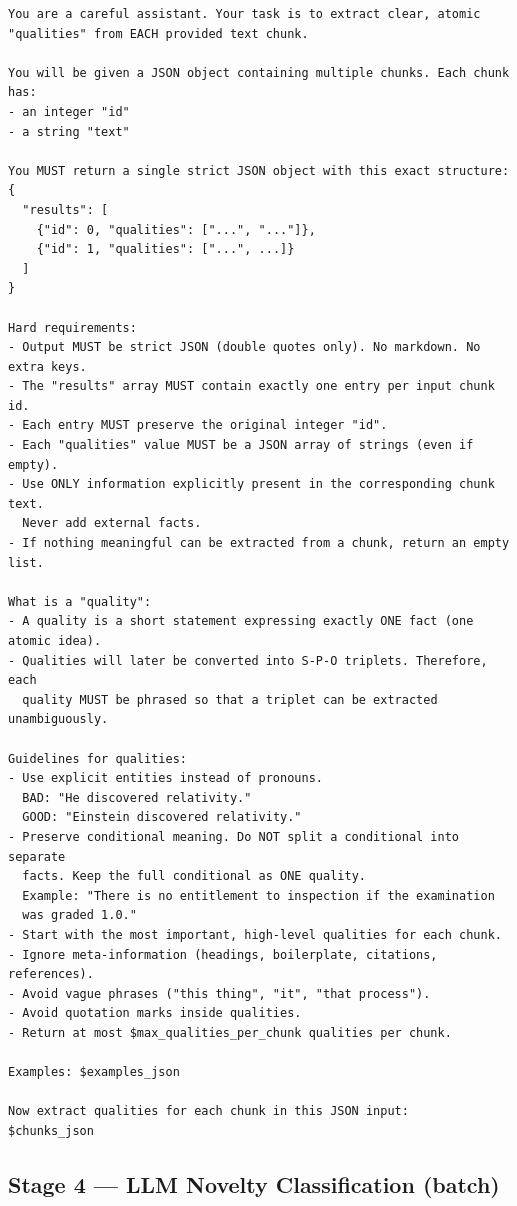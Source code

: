 \begin{lstlisting}[language={},breaklines=true,caption={},numbers=none,xleftmargin=0pt]
You are a careful assistant. Your task is to extract clear, atomic
"qualities" from EACH provided text chunk.

You will be given a JSON object containing multiple chunks. Each chunk has:
- an integer "id"
- a string "text"

You MUST return a single strict JSON object with this exact structure:
{
  "results": [
    {"id": 0, "qualities": ["...", "..."]},
    {"id": 1, "qualities": ["...", ...]}
  ]
}

Hard requirements:
- Output MUST be strict JSON (double quotes only). No markdown. No extra keys.
- The "results" array MUST contain exactly one entry per input chunk id.
- Each entry MUST preserve the original integer "id".
- Each "qualities" value MUST be a JSON array of strings (even if empty).
- Use ONLY information explicitly present in the corresponding chunk text.
  Never add external facts.
- If nothing meaningful can be extracted from a chunk, return an empty list.

What is a "quality":
- A quality is a short statement expressing exactly ONE fact (one atomic idea).
- Qualities will later be converted into S-P-O triplets. Therefore, each
  quality MUST be phrased so that a triplet can be extracted unambiguously.

Guidelines for qualities:
- Use explicit entities instead of pronouns.
  BAD: "He discovered relativity."
  GOOD: "Einstein discovered relativity."
- Preserve conditional meaning. Do NOT split a conditional into separate
  facts. Keep the full conditional as ONE quality.
  Example: "There is no entitlement to inspection if the examination
  was graded 1.0."
- Start with the most important, high-level qualities for each chunk.
- Ignore meta-information (headings, boilerplate, citations, references).
- Avoid vague phrases ("this thing", "it", "that process").
- Avoid quotation marks inside qualities.
- Return at most $max_qualities_per_chunk qualities per chunk.

Examples: $examples_json

Now extract qualities for each chunk in this JSON input:
$chunks_json
\end{lstlisting}

\subsection{Stage 4 — LLM Novelty Classification (batch)}
\label{app:prompt-novelty-batch}

